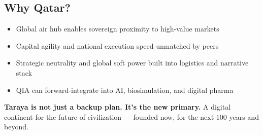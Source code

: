 \documentclass[12pt]{article}
\begin{document}
\begin{spacing}{1.15}
\section*{Why Qatar?}
\begin{itemize}
  \item Global air hub enables sovereign proximity to high-value markets
  \item Capital agility and national execution speed unmatched by peers
  \item Strategic neutrality and global soft power built into logistics and narrative stack
  \item QIA can forward-integrate into AI, biosimulation, and digital pharma
\end{itemize}


\vspace{1em}
\noindent
\textbf{Taraya is not just a backup plan. It's the new primary.}  
A digital continent for the future of civilization — founded now, for the next 100 years and beyond.

\end{spacing}
\end{document}
